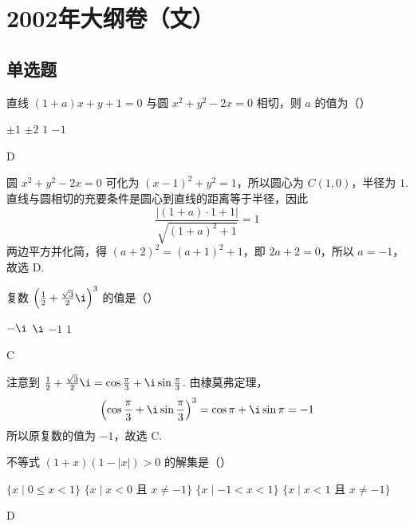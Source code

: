 \chapter{2002年大纲卷（文）}
\section{单选题}
\begin{problem}
直线 \((1 + a)x + y + 1 = 0\) 与圆 \(x^{2} + y^{2} - 2x = 0\) 相切，则 \(a\) 的值为（\quad）

\choices
    {\(\pm 1\)}
    {\(\pm 2\)}
    {\(1\)}
    {\(-1\)}
\end{problem}

\begin{answer}
D
\end{answer}

\begin{solution}
圆 \(x^{2}+y^{2}-2x=0\) 可化为 \((x-1)^{2}+y^{2}=1\)，所以圆心为 \(C(1,0)\)，半径为 \(1\). 直线与圆相切的充要条件是圆心到直线的距离等于半径，因此
\[
\frac{|(1+a)\cdot1+1|}{\sqrt{(1+a)^{2}+1}}=1
\]
两边平方并化简，得 \((a+2)^{2}=(a+1)^{2}+1\)，即 \(2a+2=0\)，所以 \(a=-1\)，故选 D.
\end{solution}

\begin{problem}
复数 \(\left(\frac{1}{2} + \frac{\sqrt{3}}{2}\i\right)^3\) 的值是（\quad）

\choices
    {\(-\i\)}
    {\(\i\)}
    {\(-1\)}
    {\(1\)}
\end{problem}

\begin{answer}
C
\end{answer}

\begin{solution}
注意到 \(\frac{1}{2}+\frac{\sqrt{3}}{2}\i=\cos\frac{\pi}{3}+\i\sin\frac{\pi}{3}\). 由棣莫弗定理，
\[
\left(\cos\frac{\pi}{3}+\i\sin\frac{\pi}{3}\right)^{3}=\cos\pi+\i\sin\pi=-1
\]
所以原复数的值为 \(-1\)，故选 C.
\end{solution}

\begin{problem}
不等式 \((1 + x)(1 - |x|) > 0\) 的解集是（\quad）

\choices
    {\(\{x\mid 0\leqslant x < 1\}\)}
    {\(\{x\mid x < 0 \text{ 且 } x\neq -1\}\)}
    {\(\{x\mid -1 < x < 1\}\)}
    {\(\{x\mid x < 1 \text{ 且 } x\neq -1\}\)}
\end{problem}

\begin{answer}
D
\end{answer}

